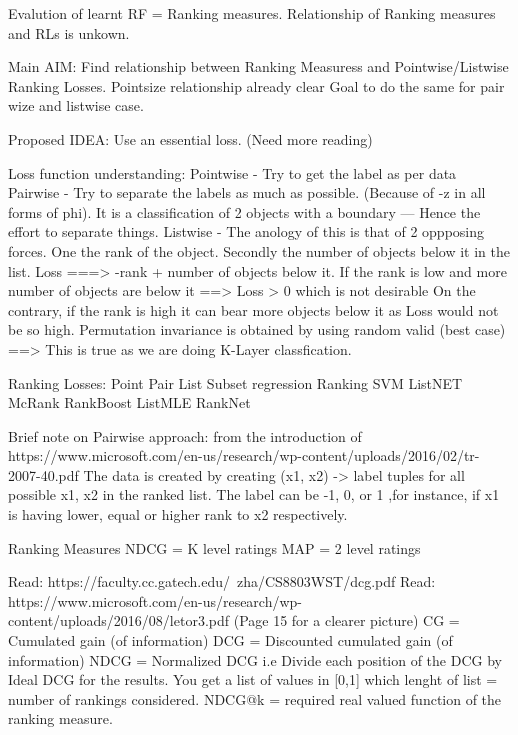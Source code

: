 \documentclass[11pt]{report}
\begin{document}
Evalution of learnt RF = Ranking measures.
Relationship of Ranking measures and RLs is unkown.


Main AIM:
    Find relationship between Ranking Measuress and Pointwise/Listwise Ranking Losses.
    Pointsize relationship already clear
    Goal to do the same for pair wize and listwise case.

Proposed IDEA:
    Use an essential loss. (Need more reading)

Loss function understanding:
Pointwise - Try to get the label as per data
Pairwise - Try to separate the labels as much as possible. (Because of -z in all forms of phi).
           It is a classification of 2 objects with a boundary --- Hence the effort to separate things.
Listwise - The anology of this is that of 2 oppposing forces. One the rank of the object. Secondly
           the number of objects below it in the list.
           Loss ===> -rank + number of objects below it.
                If the rank is low and more number of objects are below it ==> Loss > 0 which is not desirable
                On the contrary, if the rank is high it can bear more objects below it as Loss would not be so high.
           Permutation invariance is obtained by using random valid (best case)
        ==> This is true as we are doing K-Layer classfication.


Ranking Losses:
    Point               Pair            List
    Subset regression   Ranking SVM     ListNET
    McRank              RankBoost       ListMLE
                        RankNet

Brief note on Pairwise approach: from the introduction of https://www.microsoft.com/en-us/research/wp-content/uploads/2016/02/tr-2007-40.pdf
    The data is created by creating (x1, x2) -> label tuples for all possible x1, x2 in the ranked list. The label can be -1, 0, or 1
    ,for instance, if x1 is having lower, equal or higher rank to x2 respectively.

Ranking Measures
    NDCG = K level ratings
    MAP = 2 level ratings

    Read: https://faculty.cc.gatech.edu/~zha/CS8803WST/dcg.pdf
    Read: https://www.microsoft.com/en-us/research/wp-content/uploads/2016/08/letor3.pdf (Page 15 for a clearer picture)
        CG = Cumulated gain (of information)
        DCG = Discounted cumulated gain (of information)
        NDCG = Normalized DCG i.e Divide each position of the DCG by Ideal DCG for the results.
               You get a list of values in [0,1] which lenght of list = number of rankings considered.
        NDCG@k = required real valued function of the ranking measure.
\end{document}
